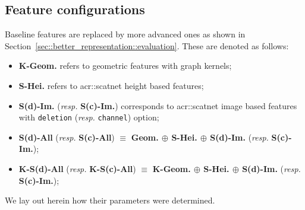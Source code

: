    \subsection{Feature configurations}
        \label{sec::better_representation::implementation::features}
        Baseline features are replaced by more advanced ones as shown in Section~\ref{sec::better_representation::evaluation}.
        These are denoted as follows:
        \begin{itemize}[label=\(\blacktriangleright\)]
            \item \textbf{K-Geom.} refers to geometric features with graph kernels;
            \item \textbf{S-Hei.} refers to \gls{acr::scatnet} height based features;
            \item \textbf{S(d)-Im.} (\textit{resp.} \textbf{S(c)-Im.}) corresponds to \gls{acr::scatnet} image based features with \texttt{deletion} (\textit{resp.} \texttt{channel}) option;
            \item \textbf{S(d)-All} (\textit{resp.} \textbf{S(c)-All}) \(\equiv\) \textbf{Geom. \(\oplus\) S-Hei. \(\oplus\) S(d)-Im.} (\textit{resp.} \textbf{S(c)-Im.});
            \item \textbf{K-S(d)-All} (\textit{resp.} \textbf{K-S(c)-All}) \(\equiv\) \textbf{K-Geom. \(\oplus\) S-Hei. \(\oplus\) S(d)-Im.} (\textit{resp.} \textbf{S(c)-Im.});
        \end{itemize}
        We lay out herein how their parameters were determined.
        
